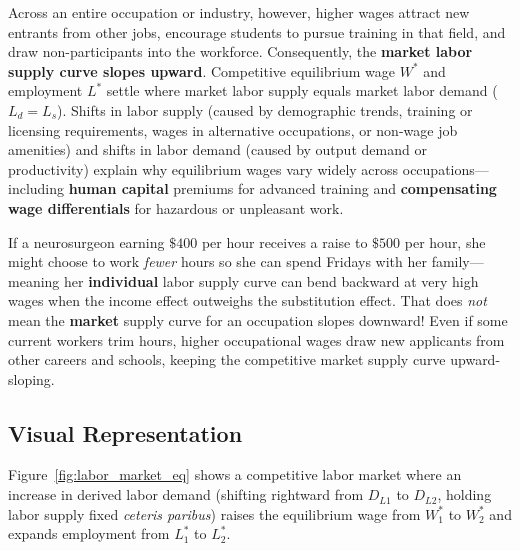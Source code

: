 \documentclass[11pt,letterpaper]{article}
\begin{document}
Across an entire occupation or industry, however, higher wages attract new entrants from other jobs, encourage students to pursue training in that field, and draw non-participants into the workforce. Consequently, the \textbf{market labor supply curve slopes upward}. Competitive equilibrium wage $W^*$ and employment $L^*$ settle where market labor supply equals market labor demand ($L_d = L_s$). Shifts in labor supply (caused by demographic trends, training or licensing requirements, wages in alternative occupations, or non-wage job amenities) and shifts in labor demand (caused by output demand or productivity) explain why equilibrium wages vary widely across occupations---including \textbf{human capital} premiums for advanced training and \textbf{compensating wage differentials} for hazardous or unpleasant work.

\begin{tcolorbox}[colback=CourseAmber!12!white,colframe=CourseOrange!85!black,title=\textbf{Clear It Up: Backward-Bending Individual Supply vs. Upward-Sloping Market Supply}]
If a neurosurgeon earning $\$400$ per hour receives a raise to $\$500$ per hour, she might choose to work \emph{fewer} hours so she can spend Fridays with her family---meaning her \textbf{individual} labor supply curve can bend backward at very high wages when the income effect outweighs the substitution effect. That does \emph{not} mean the \textbf{market} supply curve for an occupation slopes downward! Even if some current workers trim hours, higher occupational wages draw new applicants from other careers and schools, keeping the competitive market supply curve upward-sloping.
\end{tcolorbox}

\subsection*{Visual Representation}
Figure~\ref{fig:labor_market_eq} shows a competitive labor market where an increase in derived labor demand (shifting rightward from $D_{L1}$ to $D_{L2}$, holding labor supply fixed \emph{ceteris paribus}) raises the equilibrium wage from $W_1^*$ to $W_2^*$ and expands employment from $L_1^*$ to $L_2^*$.
\end{document}
